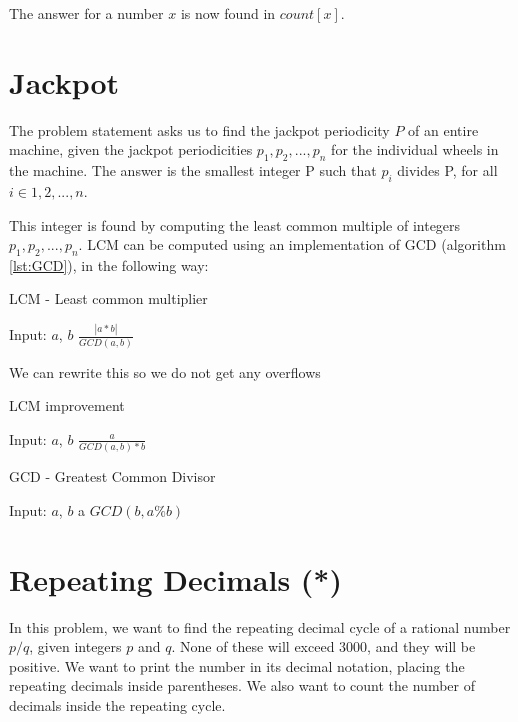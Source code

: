 \documentclass[11pt,a4paper,twoside]{article}
\begin{document}
The answer for a number $x$ is now found in $count[x]$.
\section{Jackpot}

The problem statement asks us to find the jackpot periodicity $P$ of an entire
machine, given the jackpot periodicities $p_{1},p_{2},...,p_{n}$ for the
individual wheels in the machine. The answer is the smallest integer P such
that $p_{i}$ divides P, for all $i \in {1,2,...,n}$.

This integer is found by computing the least common multiple of integers
$p_{1},p_{2},...,p_{n}$. LCM can be computed using an implementation of GCD
(algorithm \ref{lst:GCD}), in the following way:

\begin{algorithm}
    \caption{LCM - Least common multiplier}
    \label{lst:LCM}
    \begin{algorithmic}
        \REQUIRE Input: $a$, $b$
        \RETURN $ \frac{|a * b|}{GCD(a, b)}$
    \end{algorithmic}
\end{algorithm}

We can rewrite this so we do not get any overflows

\begin{algorithm}
    \caption{LCM improvement}
    \label{lst:LCM improvement}
    \begin{algorithmic}
        \REQUIRE Input: $a$, $b$
        \RETURN $\frac{a}{GCD(a, b) * b}$
    \end{algorithmic}
\end{algorithm}

\begin{algorithm}
    \caption{GCD - Greatest Common Divisor}
    \label{lst:GCD}
    \begin{algorithmic}
        \REQUIRE Input: $a$, $b$
            \RETURN a
        \ENDIF
        \RETURN $GCD(b, a \% b)$
    \end{algorithmic}
\end{algorithm}



\section{Repeating Decimals (*)}

In this problem, we want to find the repeating decimal cycle of a rational
number $p/q$, given integers $p$ and $q$. None of these will exceed $3000$, and
they will be positive. We want to print the number in its decimal notation,
placing the repeating decimals inside parentheses. We also want to count the
number of decimals inside the repeating cycle.
\end{document}
